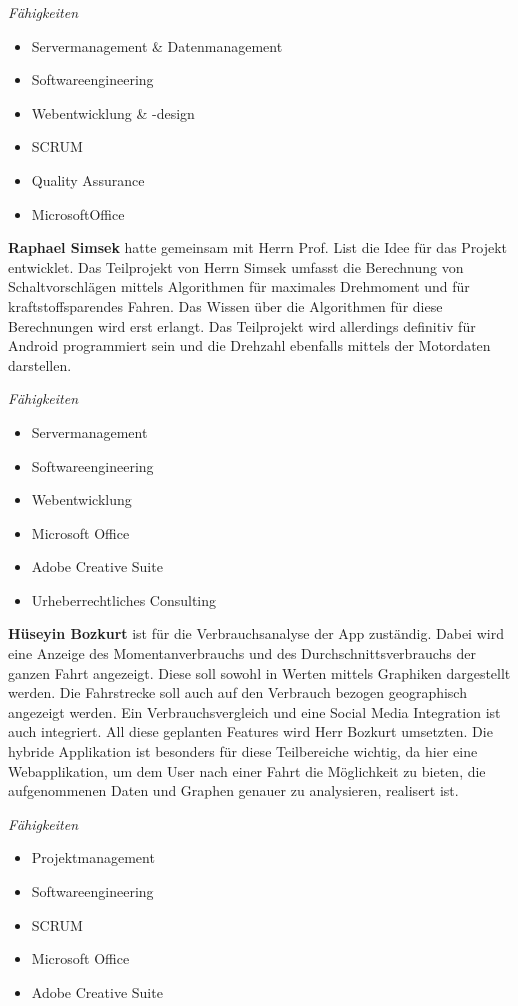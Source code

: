\textit{Fähigkeiten}
\begin{itemize}
	\item Servermanagement & Datenmanagement				
	\item Softwareengineering
	\item Webentwicklung & -design
	\item SCRUM
	\item Quality Assurance
	\item MicrosoftOffice
\end{itemize}


\textbf{Raphael Simsek} hatte gemeinsam mit Herrn Prof. List die Idee für das Projekt entwicklet. Das Teilprojekt von Herrn Simsek umfasst die Berechnung von Schaltvorschlägen mittels Algorithmen für maximales Drehmoment und für kraftstoffsparendes Fahren. Das Wissen über die Algorithmen für diese Berechnungen wird erst erlangt. Das Teilprojekt wird allerdings definitiv für Android programmiert sein und die Drehzahl ebenfalls mittels der Motordaten darstellen.

\textit{Fähigkeiten}
\begin{itemize}
	\item Servermanagement				
	\item Softwareengineering
	\item Webentwicklung
	\item Microsoft Office
	\item Adobe Creative Suite
	\item Urheberrechtliches Consulting
\end{itemize}

\textbf{Hüseyin Bozkurt} ist für die Verbrauchsanalyse der App zuständig. Dabei wird eine Anzeige des Momentanverbrauchs und des Durchschnittsverbrauchs der ganzen Fahrt angezeigt. Diese soll sowohl in Werten mittels Graphiken dargestellt werden. Die Fahrstrecke soll auch auf den Verbrauch bezogen geographisch angezeigt werden. Ein Verbrauchsvergleich und eine Social Media Integration ist auch integriert.
All diese geplanten Features wird Herr Bozkurt umsetzten. Die hybride Applikation ist besonders für diese Teilbereiche wichtig, da hier eine Webapplikation, um dem User nach einer Fahrt die Möglichkeit zu bieten, die aufgenommenen Daten und Graphen genauer zu analysieren, realisert ist.

\textit{Fähigkeiten}
\begin{itemize}
	\item Projektmanagement			
	\item Softwareengineering
	\item SCRUM
	\item Microsoft Office
	\item Adobe Creative Suite
\end{itemize}

